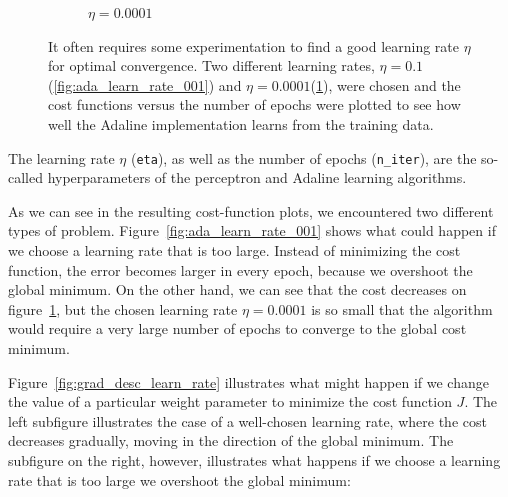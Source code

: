 \documentclass[11pt]{article}
\begin{document}
\begin{figure}[hbt!]
\begin{subfigure}[t]{.48\textwidth}
            \caption{$\eta=0.0001$}
            \label{fig:ada_learn_rate_00001}
        \end{subfigure}
        \caption{It often requires some experimentation to find a good learning rate $\eta$ for optimal convergence.
        Two different learning rates, $\eta=0.1$ (\ref{fig:ada_learn_rate_001}) and $\eta=0.0001$(\ref{fig:ada_learn_rate_00001}), were chosen and the cost functions versus the number of epochs were plotted to see how well the Adaline implementation learns from the training data.}
        \label{fig:ada_learn_rate}
    \end{figure}

    The learning rate $\eta$ (\texttt{eta}), as well as the number of epochs (\texttt{n\_iter}), are the so-called hyperparameters of the perceptron and Adaline learning algorithms.

    As we can see in the resulting cost-function plots, we encountered two different types of problem.
    Figure~\ref{fig:ada_learn_rate_001} shows what could happen if we choose a learning rate that is too large.
    Instead of minimizing the cost function, the error becomes larger in every epoch, because we overshoot the global minimum.
    On the other hand, we can see that the cost decreases on figure~\ref{fig:ada_learn_rate_00001}, but the chosen learning rate $\eta=0.0001$ is so small that the algorithm would require a very large number of epochs to converge to the global cost minimum.

    Figure~\ref{fig:grad_desc_learn_rate} illustrates what might happen if we change the value of a particular weight parameter to minimize the cost function $J$.
    The left subfigure illustrates the case of a well-chosen learning rate, where the cost decreases gradually, moving in the direction of the global minimum.
    The subfigure on the right, however, illustrates what happens if we choose a learning rate that is too large \textemdash we overshoot the global minimum:
\end{document}
